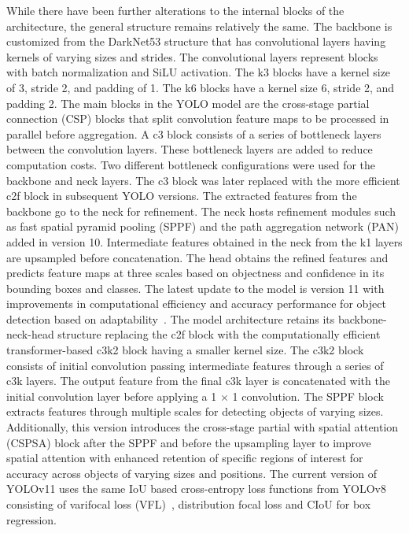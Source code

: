 While there have been further alterations to the internal blocks of the architecture, the general structure remains relatively the same. The backbone is customized from the DarkNet53 structure that has convolutional layers having kernels of varying sizes and strides. The convolutional layers represent blocks with batch normalization and SiLU activation. The k3 blocks have a kernel size of 3, stride 2, and padding of 1. The k6 blocks have a kernel size 6, stride 2, and padding 2. The main blocks in the YOLO model are the cross-stage partial connection (CSP) blocks that split convolution feature maps to be processed in parallel before aggregation. A c3 block consists of a series of bottleneck layers between the convolution layers. These bottleneck layers are added to reduce computation costs. Two different bottleneck configurations were used for the backbone and neck layers. The c3 block was later replaced with the more efficient c2f block in subsequent YOLO versions. The extracted features from the backbone go to the neck for refinement. The neck hosts refinement modules such as fast spatial pyramid pooling (SPPF) and the path aggregation network (PAN) added in version 10. Intermediate features obtained in the neck from the k1 layers are upsampled before concatenation. The head obtains the refined features and predicts feature maps at three scales based on objectness and confidence in its bounding boxes and classes. The latest update to the model is version 11 with improvements in computational efficiency and accuracy performance for object detection based on adaptability~\cite{2024Rahima}. The model architecture retains its backbone-neck-head structure replacing the c2f block with the computationally efficient transformer-based c3k2 block having a smaller kernel size. The c3k2 block consists of initial convolution passing intermediate features through a series of c3k layers. The output feature from the final c3k layer is concatenated with the initial convolution layer before applying a 1 $\times$ 1 convolution. The SPPF block extracts features through multiple scales for detecting objects of varying sizes. Additionally, this version introduces the cross-stage partial with spatial attention (CSPSA) block after the SPPF and before the upsampling layer to improve spatial attention with enhanced retention of specific regions of interest for accuracy across objects of varying sizes and positions.
The current version of YOLOv11 uses the same IoU based cross-entropy loss functions from YOLOv8 consisting of varifocal loss (VFL)~\cite{2021Zhang2}, distribution focal loss and CIoU for box regression.





